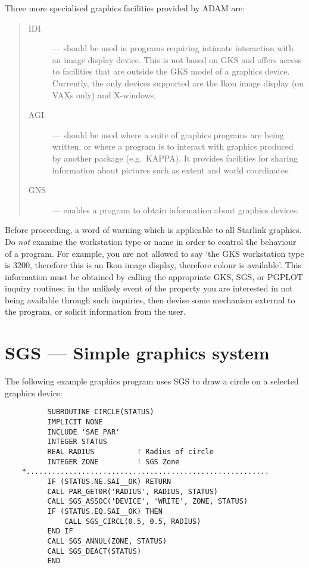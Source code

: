 Three more specialised graphics facilities provided by ADAM are:

\begin{quote}
\begin{description}

\item [IDI] --- should be used in programs requiring intimate interaction with
an image display device.
This is not based on GKS and offers access to facilities that are outside the
GKS model of a graphics device.
Currently, the only devices supported are the Ikon image display (on VAXs
only) and X-windows.

\item [AGI] --- should be used where a suite of graphics programs are being
written, or where a program is to interact with graphics produced by another
package (e.g.\ KAPPA).
It provides facilities for sharing information about pictures such as extent
and world coordinates. 

\item [GNS] --- enables a program to obtain information about graphics devices.

\end{description}
\end{quote}

Before proceeding, a word of warning which is applicable to all Starlink
graphics.
Do {\em not} examine the workstation type or name in order to control the
behaviour of a program.
For example, you are not allowed to say `the GKS workstation type is 3200,
therefore this is an Ikon image display, therefore colour is available'.
This information must be obtained by calling the appropriate GKS, SGS, or
\mbox{PGPLOT} inquiry routines;  in the unlikely event of the property you are
interested in not being available through such inquiries, then devise some
mechanism external to the program, or solicit information from the user.

\section{SGS --- Simple graphics system}
\label{S_sgsgks}

The following example graphics program uses SGS to draw a circle on a selected
graphics device:

\begin{small}
\begin{verbatim}
          SUBROUTINE CIRCLE(STATUS)
          IMPLICIT NONE
          INCLUDE 'SAE_PAR'
          INTEGER STATUS
          REAL RADIUS          ! Radius of circle               
          INTEGER ZONE         ! SGS Zone
    *.........................................................
          IF (STATUS.NE.SAI__OK) RETURN
          CALL PAR_GET0R('RADIUS', RADIUS, STATUS)
          CALL SGS_ASSOC('DEVICE', 'WRITE', ZONE, STATUS)
          IF (STATUS.EQ.SAI__OK) THEN
              CALL SGS_CIRCL(0.5, 0.5, RADIUS)
          END IF
          CALL SGS_ANNUL(ZONE, STATUS)
          CALL SGS_DEACT(STATUS)
          END                  
\end{verbatim}
\end{small}


